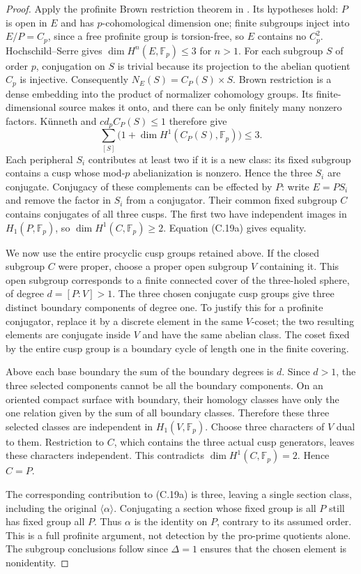 \begin{proof}
Apply the profinite Brown restriction
theorem in
\citet[Theorem 2 and \S1.1,
equations (3)--(6)]{cKochloukovaZalesskii2007}.
Its hypotheses hold: \(P\) is open
in \(E\) and has \(p\)-cohomological
dimension one; finite subgroups
inject into \(E/P=C_p\), since a
free profinite group is torsion-free,
so \(E\) contains no \(C_p^2\).
Hochschild--Serre gives
\(\dim H^n(E,\mathbb F_p)\le3\)
for \(n>1\).
For each subgroup \(S\) of order
\(p\), conjugation on \(S\) is
trivial because its projection to
the abelian quotient \(C_p\) is
injective. Consequently
\(N_E(S)=C_P(S)\times S\).
Brown restriction is a dense
embedding into the product of
normalizer cohomology groups.
Its finite-dimensional source makes
it onto, and there can be only
finitely many nonzero factors.
K\"unneth and \(cd_p C_P(S)\le1\)
therefore give
\[
 \sum_{[S]}
 \bigl(1+\dim H^1(C_P(S),\mathbb F_p)\bigr)
       \le3.
 \tag{C.19a}
\]
Each peripheral \(S_i\) contributes
at least two if it is a new class:
its fixed subgroup contains a cusp
whose mod-\(p\) abelianization is
nonzero. Hence the three \(S_i\)
are conjugate. Conjugacy of these
complements can be effected by \(P\):
write \(E=P S_i\) and remove the
factor in \(S_i\) from a conjugator.
Their common fixed subgroup \(C\)
contains conjugates of all three
cusps. The first two have independent
images in \(H_1(P,\mathbb F_p)\),
so \(\dim H^1(C,\mathbb F_p)\ge2\).
Equation (C.19a) gives equality.

We now use the entire procyclic cusp
groups retained above. If the closed
subgroup \(C\) were proper, choose a
proper open subgroup \(V\) containing
it. This open subgroup corresponds to
a finite connected cover of the
three-holed sphere, of degree
\(d=[P:V]>1\). The three chosen
conjugate cusp groups give three
distinct boundary components of
degree one. To justify this for a
profinite conjugator, replace it by
a discrete element in the same
\(V\)-coset; the two resulting
elements are conjugate inside \(V\)
and have the same abelian class.
The coset fixed by the entire cusp
group is a boundary cycle of length
one in the finite covering.

Above each base boundary the sum of
the boundary degrees is \(d\).
Since \(d>1\), the three selected
components cannot be all the
boundary components. On an oriented
compact surface with boundary, their
homology classes have only the one
relation given by the sum of all
boundary classes. Therefore these
three selected classes are independent
in \(H_1(V,\mathbb F_p)\). Choose
three characters of \(V\) dual to
them. Restriction to \(C\), which
contains the three actual cusp
generators, leaves these characters
independent. This contradicts
\(\dim H^1(C,\mathbb F_p)=2\).
Hence \(C=P\).

The corresponding contribution to
(C.19a) is three, leaving a single
section class, including the
original \(\langle\alpha\rangle\).
Conjugating a section whose fixed
group is all \(P\) still has fixed
group all \(P\). Thus \(\alpha\)
is the identity on \(P\), contrary
to its assumed order.
This is a full profinite argument,
not detection by the pro-prime
quotients alone.
The subgroup conclusions follow
since \(\Delta=1\) ensures that
the chosen element is nonidentity.
\end{proof}

